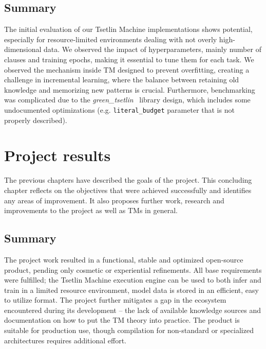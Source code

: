 \documentclass[english]{aghengthesis} %
\newcommand*{\GreenTsetlinName}{\emph{green\_tsetlin}~\cite{glimsdal2024greentsetlin} }
\begin{document}
\section{Summary}
The initial evaluation of our Tsetlin Machine implementations shows potential, especially for resource-limited environments dealing with not overly high-dimensional data. We observed the impact of hyperparameters, mainly number of clauses and training epochs, making it essential to tune them for each task. We observed the mechanism inside TM designed to prevent overfitting, creating a challenge in incremental learning, where the balance between retaining old knowledge and memorizing new patterns is crucial. Furthermore, benchmarking was complicated due to the \GreenTsetlinName library design, which includes some undocumented optimizations (e.g. \texttt{literal\_budget} parameter that is not properly described).


\chapter{Project results}
\label{chap:results}


The previous chapters have described the goals of the project. This concluding chapter reflects on the objectives that were achieved successfully and identifies any areas of improvement. It also proposes further work, research and improvements to the project as well as TMs in general.

\section{Summary}
The project work resulted in a functional, stable and optimized open-source product, pending only cosmetic or experiential refinements. All base requirements were fulfilled; the Tsetlin Machine execution engine can be used to both infer and train in a limited resource environment, model data is stored in an efficient, easy to utilize format. The project further mitigates a gap in the ecosystem encountered during its development -- the lack of available knowledge sources and documentation on how to put the TM theory into practice. The product is suitable for production use, though compilation for non-standard or specialized architectures requires additional effort.
\end{document}
